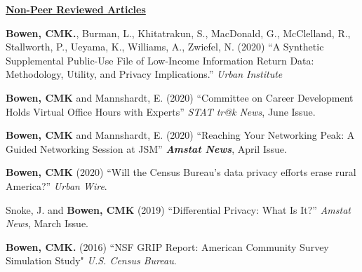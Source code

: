 \documentclass[11pt, letterpaper, roman]{moderncv} %
\begin{document}
\vspace{4pt}
\noindent\underline{\textbf{Non-Peer Reviewed Articles}}

\begin{etaremune}[topsep=0pt, itemsep=3pt, partopsep=0pt, parsep=0pt]
    \item \textbf{Bowen, CMK.}, Burman, L., Khitatrakun, S., MacDonald, G., McClelland, R., Stallworth, P., Ueyama, K., Williams, A., Zwiefel, N. (2020) ``A Synthetic Supplemental Public-Use File of Low-Income Information Return Data: Methodology, Utility, and Privacy Implications.'' \textit{Urban Institute}

    \item \textbf{Bowen, CMK} and Mannshardt, E. (2020) ``Committee on Career Development Holds Virtual Office Hours with Experts'' \textit{STAT tr@k News}, June Issue.

    \item \textbf{Bowen, CMK} and Mannshardt, E. (2020) ``Reaching Your Networking Peak: A Guided Networking Session at JSM'' \textbf{\textit{Amstat News}}, April Issue.
    
    \item \textbf{Bowen, CMK} (2020) ``Will the Census Bureau's data privacy efforts erase rural America?'' \textit{Urban Wire}. 
    
    \item Snoke, J. and \textbf{Bowen, CMK} (2019) ``Differential Privacy: What Is It?'' \textit{Amstat News}, March Issue.
    
    \item \textbf{Bowen, CMK.} (2016) ``NSF GRIP Report: American Community Survey Simulation Study" \textit{U.S. Census Bureau}.  
\end{etaremune}

    
    

\end{document}

